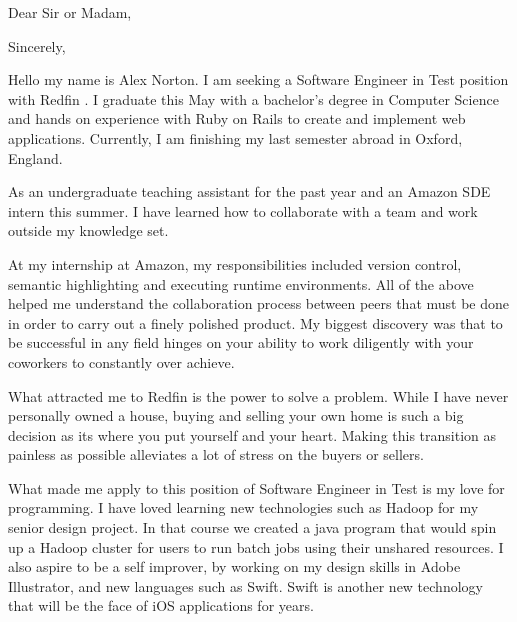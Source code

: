 \documentclass{my_cv}
\begin{document}
\newcommand{\companyName}{Redfin } %
\newcommand{\jobTitle}{Software Engineer in Test }
\recipient{\companyName \ Recruitment team}{\companyName }
\date{\today}
\opening{Dear Sir or Madam,}
\closing{Sincerely,}
\makelettertitle


\indent Hello my name is Alex Norton.   I am seeking a \jobTitle
position with \companyName.   I graduate this May with a bachelor’s degree in
Computer Science and hands on experience with Ruby on Rails to create and
implement web applications.  Currently, I am finishing my last semester abroad
in Oxford, England. 

As an undergraduate teaching assistant for the past year and an Amazon SDE
intern this summer.  I have learned how to collaborate with a team and work
outside my knowledge set.

At my internship at Amazon, my responsibilities included version control,
semantic highlighting and executing runtime environments.  All of the above
helped me understand the collaboration process between peers that must be
done in order to carry out a finely polished product.  My biggest discovery
was that to be successful in any field hinges on your ability to work
diligently with your coworkers to constantly over achieve.

What attracted me to \companyName is the power to solve a problem.  While I have
never personally owned a house, buying and selling your own home is such a big
decision as its where you put yourself and your heart.  Making this transition
as painless as possible alleviates a lot of stress on the buyers or sellers.

What made me apply to this position of \jobTitle is my love for
programming.  I have loved learning new technologies such as Hadoop for my
senior design project.  In that course we created a java program that would spin
up a Hadoop cluster for users to run batch jobs using their unshared resources.
I also aspire to be a self improver, by working on my design
skills in Adobe Illustrator, and new languages such as Swift.  Swift is another 
new technology that will be the face of iOS applications for years.
\end{document}
